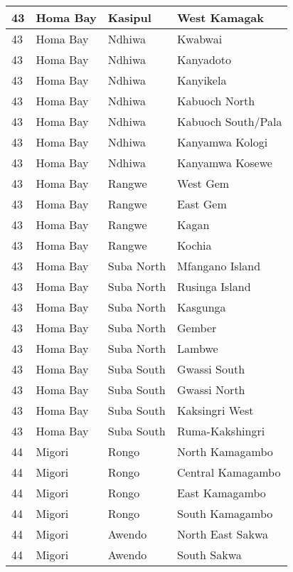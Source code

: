 \begin{table}[!ht]
\begin{tabular}{|l|l|l|l|}
        43 & Homa Bay & Kasipul & West Kamagak \\ \hline
        43 & Homa Bay & Ndhiwa & Kwabwai \\ \hline
        43 & Homa Bay & Ndhiwa & Kanyadoto \\ \hline
        43 & Homa Bay & Ndhiwa & Kanyikela \\ \hline
        43 & Homa Bay & Ndhiwa & Kabuoch North \\ \hline
        43 & Homa Bay & Ndhiwa & Kabuoch South/Pala \\ \hline
        43 & Homa Bay & Ndhiwa & Kanyamwa Kologi \\ \hline
        43 & Homa Bay & Ndhiwa & Kanyamwa Kosewe \\ \hline
        43 & Homa Bay & Rangwe & West Gem \\ \hline
        43 & Homa Bay & Rangwe & East Gem \\ \hline
        43 & Homa Bay & Rangwe & Kagan \\ \hline
        43 & Homa Bay & Rangwe & Kochia \\ \hline
        43 & Homa Bay & Suba North & Mfangano Island \\ \hline
        43 & Homa Bay & Suba North & Rusinga Island \\ \hline
        43 & Homa Bay & Suba North & Kasgunga \\ \hline
        43 & Homa Bay & Suba North & Gember \\ \hline
        43 & Homa Bay & Suba North & Lambwe \\ \hline
        43 & Homa Bay & Suba South & Gwassi South \\ \hline
        43 & Homa Bay & Suba South & Gwassi North \\ \hline
        43 & Homa Bay & Suba South & Kaksingri West \\ \hline
        43 & Homa Bay & Suba South & Ruma-Kakshingri \\ \hline
        44 & Migori & Rongo & North Kamagambo \\ \hline
        44 & Migori & Rongo & Central Kamagambo \\ \hline
        44 & Migori & Rongo & East Kamagambo \\ \hline
        44 & Migori & Rongo & South Kamagambo \\ \hline
        44 & Migori & Awendo & North East Sakwa \\ \hline
        44 & Migori & Awendo & South Sakwa \\ \hline

\end{tabular}
\end{table}
